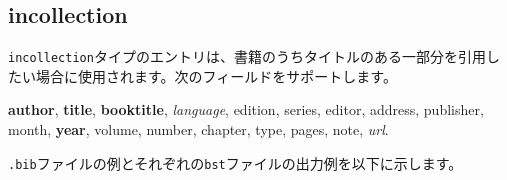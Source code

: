 \documentclass[10pt, a4paper]{jsarticle}
\renewcommand{\refname}{\small 参考文献}
\newcommand{\putlst}[1]{
  \noindent\makebox[\linewidth]{\rule{\linewidth}{0.4pt}}\vspace{-1.5zw}
  \vspace{-1.8zw}
  \noindent\makebox[\linewidth]{\rule{\linewidth}{0.4pt}}\vspace{0.5zw}\par
}
\begin{document}
\begin{bibunit}[IEEJtran]
  \nocite{Inproceedings,jpInproceedings1,enInproceedings1,jpInproceedings2,enInproceedings2}
  \renewcommand{\refname}{\small 参考文献(IEEJtran.bst)}
  {\small \putbib[inproceedings]}
\end{bibunit}
\begin{bibunit}[jIEEEtran]
  \nocite{Inproceedings,jpInproceedings1,enInproceedings1,jpInproceedings2,enInproceedings2}
  \renewcommand{\refname}{\small 参考文献(jIEEEtran.bst)}
  {\small \putbib[inproceedings]}
\end{bibunit}
\begin{bibunit}[IEEJtran]
  \nocite{jpInproceedings1/ej/enInproceedings1,jpInproceedings2/ej/enInproceedings2}
  \renewcommand{\refname}{\small 英日を併記した参考文献(IEEJtran.bst)}
  {\small \putbib[inproceedings]}
\end{bibunit}
\begin{bibunit}[jIEEEtran]
  \nocite{jpInproceedings1/ej/enInproceedings1,jpInproceedings2/ej/enInproceedings2}
  \renewcommand{\refname}{\small 英日を併記した参考文献(jIEEEtran.bst)}
  {\small \putbib[inproceedings]}
\end{bibunit}



\subsection{incollection}

\texttt{incollection}タイプのエントリは、書籍のうちタイトルのある一部分を引用したい場合に使用されます。次のフィールドをサポートします。

\begin{center}
  \textbf{author}, \textbf{title}, \textbf{booktitle}, \textsl{language}, edition, series, editor, address, publisher, \\
  month, \textbf{year}, volume, number, chapter, type, pages, note, \textsl{url}.
\end{center}

\texttt{.bib}ファイルの例とそれぞれの\texttt{bst}ファイルの出力例を以下に示します。

\putlst{incollection.bib}
\end{document}
